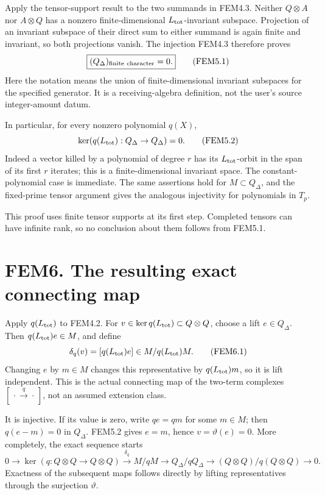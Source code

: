 Apply the tensor-support result to the two summands in FEM4.3. Neither
\(Q\otimes A\) nor \(A\otimes Q\) has a nonzero finite-dimensional
\(L_{\rm tot}\)-invariant subspace. Projection of an invariant subspace
of their direct sum to either summand is again finite and invariant, so
both projections vanish. The injection FEM4.3 therefore proves \[
\boxed{(Q_\Delta)_{\rm finite\ character}=0.}
\tag{FEM5.1}
\] Here the notation means the union of finite-dimensional invariant
subspaces for the specified generator. It is a receiving-algebra
definition, not the user's source integer-amount datum.

In particular, for every nonzero polynomial \(q(X)\), \[
\ker(q(L_{\rm tot}):Q_\Delta\to Q_\Delta)=0.
\tag{FEM5.2}
\] Indeed a vector killed by a polynomial of degree \(r\) has its
\(L_{\rm tot}\)-orbit in the span of its first \(r\) iterates; this is a
finite-dimensional invariant space. The constant-polynomial case is
immediate. The same assertions hold for \(M\subset Q_\Delta\), and the
fixed-prime tensor argument gives the analogous injectivity for
polynomials in \(T_p\).

This proof uses finite tensor supports at its first step. Completed
tensors can have infinite rank, so no conclusion about them follows from
FEM5.1.

\section{FEM6. The resulting exact connecting
map}\label{fem6.-the-resulting-exact-connecting-map}

Apply \(q(L_{\rm tot})\) to FEM4.2. For
\(v\in\ker q(L_{\rm tot})\subset Q\otimes Q\), choose a lift
\(e\in Q_\Delta\). Then \(q(L_{\rm tot})e\in M\), and define \[
\delta_q(v)=[q(L_{\rm tot})e]\in M/q(L_{\rm tot})M.
\tag{FEM6.1}
\] Changing \(e\) by \(m\in M\) changes this representative by
\(q(L_{\rm tot})m\), so it is lift independent. This is the actual
connecting map of the two-term complexes
\([\,\cdot\xrightarrow q\cdot\,]\), not an assumed extension class.

It is injective. If its value is zero, write \(q e=q m\) for some
\(m\in M\); then \(q(e-m)=0\) in \(Q_\Delta\). FEM5.2 gives \(e=m\),
hence \(v=\vartheta(e)=0\). More completely, the exact sequence starts
\[
0\to\ker(q:Q\otimes Q\to Q\otimes Q)
 \xrightarrow{\delta_q}M/qM
 \longrightarrow Q_\Delta/qQ_\Delta
 \longrightarrow (Q\otimes Q)/q(Q\otimes Q)\to0.
\tag{FEM6.2}
\] Exactness of the subsequent maps follows directly by lifting
representatives through the surjection \(\vartheta\).

